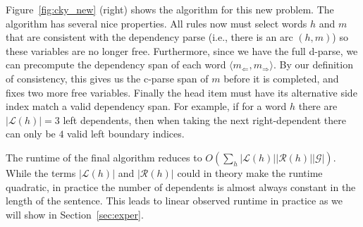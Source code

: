 \documentclass[11pt,letterpaper]{article}
\newcommand{\rules}{\mathcal{G}}
\newcommand{\LeftS}{\mathcal{L} }
\newcommand{\RightS}{\mathcal{R} }
\newcommand{\Left}[1]{#1_{\Leftarrow}}
\newcommand{\Right}[1]{#1_{\Rightarrow}}
\newcommand{\Span}[1]{\langle #1 \rangle}
\newcommand{\Head}{\mathrm{head}}
\begin{document}
Figure~\ref{fig:cky_new} (right) shows the algorithm for this new
problem.  The algorithm has several nice properties. All rules now
must select words $h$ and $m$ that are consistent with the dependency
parse (i.e., there is an arc $(h, m)$) so these variables are no longer free.
Furthermore, since we have the full d-parse, we can precompute the
dependency span of each word $\Span{\Left{m},\Right{m}}$. By our
definition of consistency, this gives us the c-parse span of $m$ before
it is completed, and fixes two more free variables. Finally the head
item must have its alternative side index match a valid dependency
span. For example, if for a word $h$ there are $|\LeftS(h)| = 3$ left
dependents, then when taking the next right-dependent there can only
be $4$ valid left boundary indices.

The runtime of the final algorithm reduces to
$O(\sum_{h} |\LeftS(h)||\RightS(h)||\rules|)$. While the terms
$|\LeftS(h)|$ and $|\RightS(h)|$ could in theory make the runtime
quadratic, in practice the number of dependents is almost always
constant in the length of the sentence. This leads to linear observed
runtime in practice as we will show in
Section~\ref{sec:exper}.
  





\end{document}

